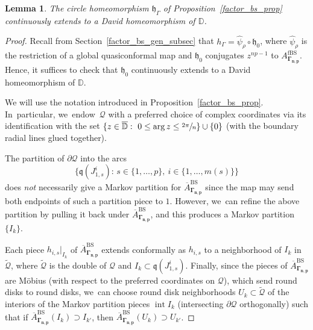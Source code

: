 \documentclass[JEP,XML,SOM,Unicode,NoFloatCountersInSection,published]{cedram}
\newtheorem{lemma}{Lemma}[section]
\theoremstyle{definition}
\theoremstyle{remark}
\newcommand{\D}{\mathbb{D}}
\DeclareMathOperator{\Int}{int}
\begin{document}
\begin{lemma}\label{david_ext_lem}
The circle homeomorphism $\mathfrak{h}_\Gamma$ of Proposition~\ref{factor_bs_prop} continuously extends to a David homeomorphism of $\D$.
\end{lemma}
\begin{proof}
Recall from Section~\ref{factor_bs_gen_subsec} that $h_\Gamma=\widehat{\psi}_\rho\circ\mathfrak{h}_0$, where $\widehat{\psi}_\rho$ is the restriction of a global quasiconformal map and $\mathfrak{h}_0$ conjugates $z^{np-1}$ to $A_{\pmb{\Gamma_{n,p}}}^{\mathrm{fBS}}$. Hence, it suffices to check that $\mathfrak{h}_0$ continuously extends to a David homeomorphism of $\D$.

We will use the notation introduced in Proposition~\ref{factor_bs_prop}. In~particular, we~endow~$\mathcal{\mathcal{Q}}$ with a preferred choice of complex coordinates via its identification with the set \hbox{$\{z\in\overline{\D}:\ 0\leq\arg{z}\leq\sfrac{2\pi}{n}\}\cup\{0\}$} (with the boundary radial lines glued together).

The partition of $\partial\mathcal{Q}$ into the arcs
\[
\bigl\{\mathfrak{q}(J_{1,s}^i): \, s\in\{1,\dots,p\},\ i\in\{1,\dots,m(s)\}\bigr\}
\]
does \emph{not} necessarily give a Markov partition for $\overline{A}_{\pmb{\Gamma_{n,p}}}^{\mathrm{BS}}$ since the map may send both endpoints of such a partition piece to $1$. However, we~can refine the above partition by pulling it back under $\overline{A}_{\pmb{\Gamma_{n,p}}}^{\mathrm{BS}}$, and this produces a Markov partition~$\{I_k\}$.

Each piece $h_{i,s}\vert_{I_k}$ of $\overline{A}_{\pmb{\Gamma_{n,p}}}^{\mathrm{BS}}$ extends conformally as $h_{i,s}$ to a neighborhood of $I_k$ in~$\widetilde{\mathcal{Q}}$, where $\widetilde{\mathcal{Q}}$ is the double of $\mathcal{Q}$ and $I_k\subset \mathfrak{q}(J_{1,s}^i)$.
Finally, since the pieces of $\overline{A}_{\pmb{\Gamma_{n,p}}}^{\mathrm{BS}}$ are Möbius (with respect to the preferred coordinates on $\mathcal{Q}$), which send round disks to round disks, we~can choose round disk neighborhoods $U_k\subset \widetilde{\mathcal{Q}}$ of the interiors of the Markov partition pieces $\Int{I_k}$ (intersecting $\partial\mathcal{Q}$ orthogonally) such that if \hbox{$\overline{A}_{\pmb{\Gamma_{n,p}}}^{\mathrm{BS}}(I_k)\supset I_{k'}$}, then $\overline{A}_{\pmb{\Gamma_{n,p}}}^{\mathrm{BS}}(U_k)\supset U_{k'}$.


\end{proof}
\end{document}
